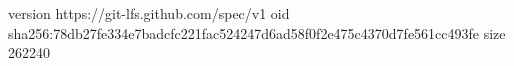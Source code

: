 version https://git-lfs.github.com/spec/v1
oid sha256:78db27fe334e7badcfc221fac524247d6ad58f0f2e475c4370d7fe561cc493fe
size 262240

